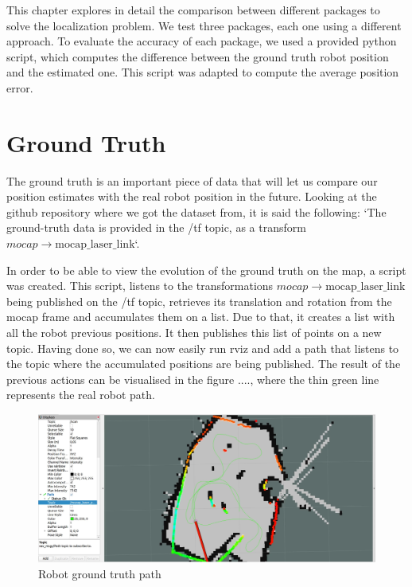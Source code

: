 \cleardoublepage
\label{chap:architecture}

This chapter explores in detail the comparison between different packages to solve the localization problem. We test three packages, each one using a different approach.
To evaluate the accuracy of each package, we used a provided python script, which computes the difference between the ground truth robot position and the estimated one. This script was adapted to compute the average position error.
\section{Ground Truth}

The ground truth is an important piece of data that will let us compare our position estimates with the real robot position in the future. Looking at the github repository where we got the dataset from, it is said the following: `The ground-truth data is provided in the /tf topic, as a transform \(mocap \rightarrow \mathrm{mocap\_laser\_link}\)`.

In order to be able to view the evolution of the ground truth on the map, a script was created. This script, listens to the transformations \(mocap \rightarrow \mathrm{mocap\_laser\_link}\) being published on the /tf topic, retrieves its translation and rotation from the mocap frame and accumulates them on a list. Due to that, it creates a list with all the robot previous positions. It then publishes this list of points on a new topic. Having done so, we can now easily run rviz and add a path that listens to the topic where the accumulated positions are being published. The result of the previous actions can be visualised in the figure ...., where the thin green line represents the real robot path.

\begin{figure}[h]
\centering
\includegraphics[scale=0.2]{./Images/mocapRviz}
\caption{Robot ground truth path}
\label{fig:flowchart}
\end{figure}

